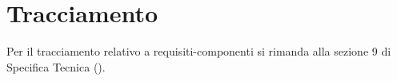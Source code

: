 \section{Tracciamento}

Per il tracciamento relativo a requisiti-componenti si rimanda alla sezione 9 di Specifica Tecnica (\textit{\SpecificaTecnica}).
